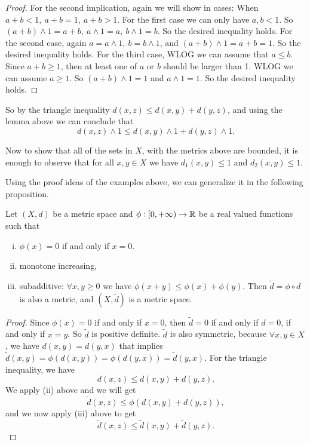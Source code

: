 \begin{solution}
\begin{enumerate}[(i)]
\begin{lemma}
\begin{proof}
				For the second implication, again we will show in cases: When $ a+b < 1,\ a+b = 1,\ a+b>1 $. For the first case we can only have $ a,b < 1 $. So $ (a+b)\wedge 1= a+b,\ a\wedge 1 = a,\ b\wedge 1 = b $. So the desired inequality holds. For the second case, again $ a=a\wedge 1,\ b=b\wedge 1 $, and $ (a+b)\wedge 1 = a+b =1 $. So the desired inequality holds. For the third case, WLOG we can assume that $ a\leq b $. Since $ a+b \geq 1 $, then at least one of $ a $ or $ b $ should be larger than 1. WLOG we can assume $ a\geq 1 $. So $ (a+b)\wedge 1 = 1 $ and $ a\wedge 1 = 1 $. So the desired inequality holds.
			\end{proof}
		\end{lemma}
		So by the triangle inequality $ d(x,z)\leq d(x,y) + d(y,z) $, and using the lemma above we can conclude that
		\[ d(x,z) \wedge 1 \leq d(x,y)\wedge 1 + d(y,z) \wedge 1. \]
	\end{enumerate}
	
	Now to show that all of the sets in $ X $, with the metrics above are bounded, it is enough to observe that for all $ x,y \in X $ we have $ d_1(x,y) \leq 1 $ and $ d_2(x,y) \leq 1 $.
\end{solution}
\begin{summary}
	Using the proof ideas of the examples above, we can generalize it in the following proposition.
	\begin{proposition}
		Let $ (X,d) $ be a metric space and $ \phi:[0,+\infty)\to \mathbb{R} $ be a real valued functions such that
		\begin{enumerate}[(i)]
			\item $ \phi(x) = 0 $ if and only if $ x = 0 $.
			\item monotone increasing,
			\item subadditive: $ \forall x,y \geq 0 $ we have $ \phi(x+y) \leq \phi(x) + \phi(y) $.
			Then $ \tilde{d} = \phi\circ d $ is also a metric, and $ (X,\tilde{d}) $ is a metric space.
		\end{enumerate}
	\end{proposition}
	\begin{proof}
		Since $ \phi(x) = 0 $ if and only if $ x = 0 $, then $ \tilde{d} = 0 $ if and only if $ d = 0 $, if and only if $ x=y $. So $ \tilde{d} $ is positive definite. $ \tilde{d} $ is also symmetric, because $ \forall x,y \in X $, we have $ d(x,y) = d(y,x) $ that implies $ \tilde{d}(x,y) = \phi(d(x,y)) = \phi(d(y,x)) = \tilde{d}(y,x). $ For the triangle inequality, we have
		\[ d(x,z) \leq d(x,y)  + d(y,z). \]
		We apply (ii) above and we will get
		\[ \tilde{d}(x,z) \leq \phi(d(x,y) + d(y,z)), \]
		and we now apply (iii) above to get
		\[ \tilde{d}(x,z) \leq \tilde{d}(x,y) + \tilde{d}(y,z). \]
	\end{proof}
\end{summary}


